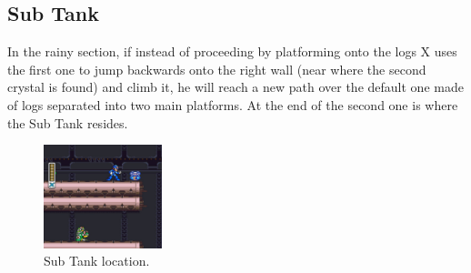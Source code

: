 \subsection{Sub Tank}
In the rainy section, if instead of proceeding by platforming onto the logs X uses the first one to jump backwards onto the right wall (near where the second crystal is found) and climb it, he will reach a new path over the default one made of logs separated into two main platforms. At the end of the second one is where the Sub Tank resides.  
\begin{figure}[htp]
	\centering
	\includegraphics[height=3cm]{figures/X2/Wire_sponge/Sponge_tank.jpg}
	\caption{Sub Tank location.}
\end{figure}


